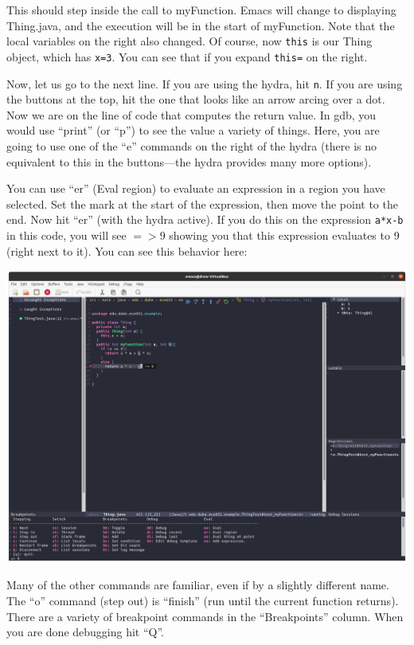\documentclass[12pt]{article}
\begin{document}
This should step inside the call to myFunction. Emacs will change to
displaying Thing.java, and the execution will be in the start of
myFunction.  Note that the local variables on the right also changed.
Of course, now \verb+this+ is our Thing object, which has \verb+x=3+.
You can see that if you expand \verb+this=+ on the right.

Now, let us go to the next line.  If you are using the hydra, hit \verb+n+. If
you are using the buttons at the top, hit the one that looks like an arrow
arcing over a dot. Now we are on the line of code that computes
the return value.  In gdb, you would use ``print'' (or ``p'') to see
the value a variety of things.  Here, you are going to use one of the
``e'' commands on the right of the hydra (there is no equivalent to this
in the buttons---the hydra provides many more options).

You can use ``er'' (Eval region) to evaluate an expression in a region
you have selected.  Set the mark 
at the start of the expression, then move the point to the end.  Now hit ``er'' (with the hydra
active).  If you do this on the expression \verb+a*x-b+ in this code,
you will see $=> 9$ showing you that this expression
evaluates to 9 (right next to it).  You can see this behavior here:

\begin{center}
  \includegraphics[width=5.5in]{emacs-debug-er.png}
\end{center}

Many of the other commands are familiar, even if by a slightly
different name.  The ``o'' command (step out) is ``finish'' (run until
the current function returns).  There are a variety of breakpoint
commands in the ``Breakpoints'' column.
When you are done debugging hit ``Q''.
\end{document}
